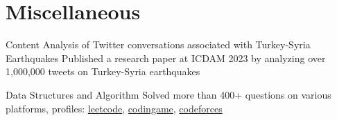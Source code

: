 \section{Miscellaneous}
\resumeSubHeadingListStart
\resumeSubheading
{Content Analysis of Twitter conversations associated with Turkey-Syria Earthquakes}{}
{Published a research paper at ICDAM 2023 by analyzing over 1,000,000 tweets on Turkey-Syria earthquakes}{}

\resumeSubheading
{Data Structures and Algorithm}{}
{Solved more than 400+ questions on various platforms, profiles: \href{https://leetcode.com/hskleetcode/}{{leetcode}}, \href{https://www.codingame.com/profile/c6263ad9e2c80e4b37e4c9da8aad5afc3227014}{{codingame}}, \href{https://codeforces.com/profile/hsk4cf}{{codeforces}}}{}
\resumeSubHeadingListEnd